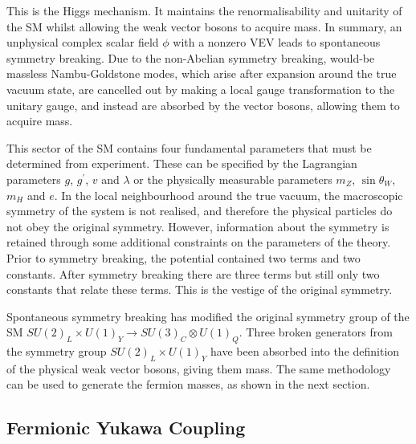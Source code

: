 This is the Higgs mechanism.
It maintains the renormalisability and unitarity of the SM whilst allowing the weak vector bosons to acquire mass.
In summary, an unphysical complex scalar field $\phi$ with a nonzero VEV leads to spontaneous symmetry breaking.
Due to the non-Abelian symmetry breaking, would\nobreakdash-be massless Nambu-Goldstone modes, which arise after expansion around the true vacuum state, are cancelled out by making a local gauge transformation to the unitary gauge, and instead are absorbed by the vector bosons, allowing them to acquire mass.

This sector of the SM contains four fundamental parameters that must be determined from experiment.
These can be specified by the Lagrangian parameters $g$, $g^\prime$, $v$ and $\lambda$ or the physically measurable parameters $m_Z$, $\sin\theta_W$, $m_H$ and $e$.
In the local neighbourhood around the true vacuum, the macroscopic symmetry of the system is not realised, and therefore the physical particles do not obey the original symmetry. 
However, information about the symmetry is retained through some additional constraints on the parameters of the theory.
Prior to symmetry breaking, the potential contained two terms and two constants. After symmetry breaking there are three terms but still only two constants that relate these terms. This is the vestige of the original symmetry. %

Spontaneous symmetry breaking has modified the original symmetry group of the SM $SU(2)_L \times U(1)_Y \rightarrow SU(3)_C \otimes U(1)_Q$.
Three broken generators from the symmetry group $SU(2)_L \times U(1)_Y$ have been absorbed into the definition of the physical weak vector bosons, giving them mass.
The same methodology can be used to generate the fermion masses, as shown in the next section. 



\subsection{Fermionic Yukawa Coupling}\label{sec:higgs_yukawa_coupling}

